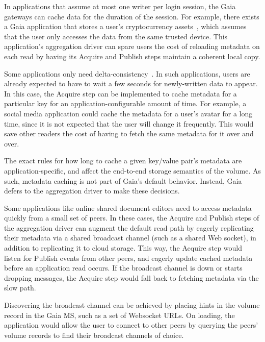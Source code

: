 
In applications that assume at most one writer per login session,
the Gaia gateways can cache data for the duration of the session.
For example, there exists a Gaia application that stores a user's
cryptocurrency assets~\cite{blockstack-cryptoasset-app}, which assumes that the
user only accesses the data from the same trusted device.  This application's
aggregation driver can
spare users the cost of reloading metadata on each read by having its Acquire
and Publish steps maintain a coherent local copy.

Some applications only need delta-consistency~\cite{delta-consistency}.  In such
applications, users are already expected to have to wait a few seconds for newly-written data to
appear.  In this case, the Acquire step can be implemented to cache metadata for
a particular key for an application-configurable amount of time.  For example, a
social media application could cache the metadata for a user's avatar for a long
time, since it is not expected that the user will change it frequently.  This
would save other readers the cost of having to fetch the same metadata for it 
over and over.

The exact rules for how long to cache a given key/value pair's metadata are
application-specific, and affect the end-to-end storage semantics of the volume.
As such, metadata caching is not part of Gaia's default
behavior.  Instead, Gaia defers to the aggregation driver to make these
decisions.


Some applications like online shared document editors need to access metadata quickly
from a small set of peers.  In these cases, the Acquire and Publish steps of the
aggregation driver can augment the default read path by eagerly replicating
their metadata via a shared broadcast channel (such as a shared Web socket), in
addition to replicating it to cloud storage.
This way, the Acquire step would listen for Publish events from other peers, and
eagerly update cached metadata before an application read occurs.  If the
broadcast channel is down or starts dropping messages, the Acquire step would fall back
to fetching metadata via the slow path.

Discovering the broadcast channel can be achieved by placing hints in the
volume record in the Gaia MS, such as a set of Websocket URLs.  On loading, the
application would allow the user to connect to other peers by querying the
peers' volume records to find their broadcast channels of choice.

